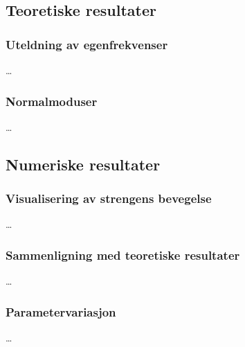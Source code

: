 \subsection{Teoretiske resultater}
\subsubsection{Uteldning av egenfrekvenser}
\dots

\subsubsection{Normalmoduser}
\dots





\subsection{Numeriske resultater}
\subsubsection{Visualisering av strengens bevegelse}
\dots

\subsubsection{Sammenligning med teoretiske resultater}
\dots

\subsubsection{Parametervariasjon}
\dots